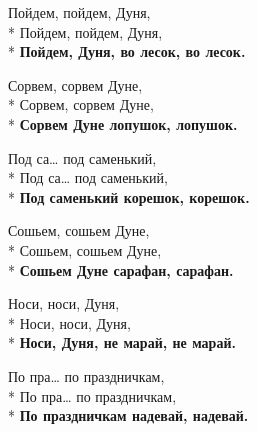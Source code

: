 \medskip

\begin{minipage}{\linewidth}
Пойдем, пойдем, Дуня,\\*
Пойдем, пойдем, Дуня,\\*
\textbf{Пойдем, Дуня, во лесок, во лесок.}\\
\end{minipage}\par\medskip\nobreak

\medskip

\begin{minipage}{\linewidth}
Сорвем, сорвем Дуне,\\*
Сорвем, сорвем Дуне,\\*
\textbf{Сорвем Дуне лопушок, лопушок.}\\
\end{minipage}\par\medskip\nobreak

\medskip

\begin{minipage}{\linewidth}
Под са… под саменький,\\*
Под са… под саменький,\\*
\textbf{Под саменький корешок, корешок.}\\
\end{minipage}\par\medskip\nobreak

\medskip

\begin{minipage}{\linewidth}
Сошьем, сошьем Дуне,\\*
Сошьем, сошьем Дуне,\\*
\textbf{Сошьем Дуне сарафан, сарафан.}\\
\end{minipage}\par\medskip\nobreak

\medskip

\begin{minipage}{\linewidth}
Носи, носи, Дуня,\\*
Носи, носи, Дуня,\\*
\textbf{Носи, Дуня, не марай, не марай.}\\
\end{minipage}\par\medskip\nobreak

\medskip

\begin{minipage}{\linewidth}
По пра… по праздничкам,\\*
По пра… по праздничкам,\\*
\textbf{По праздничкам надевай, надевай.}\\
\end{minipage}\par\medskip\nobreak

